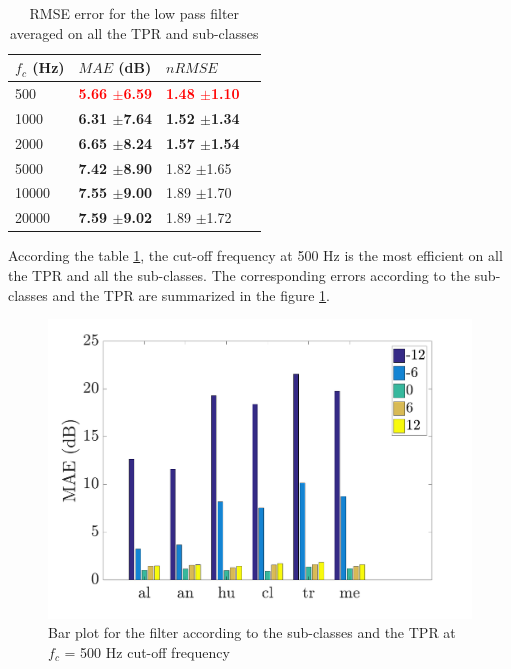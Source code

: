 \documentclass[twocolumn,a4paper,10pt]{article}
\begin{document}
\begin{table}[h]
\centering
\begin{tabular}{llll}
$f_c$ (Hz) & $MAE$ (dB) & $nRMSE$  \\ \hline
 500 & \textbf{\textcolor{red}{5.66 $\pm$6.59}} & \textbf{\textcolor{red}{1.48 $\pm$1.10}} \\
 1000 & \textbf{6.31 $\pm$7.64} & \textbf{1.52 $\pm$1.34} \\
 2000 & \textbf{6.65 $\pm$8.24} & \textbf{1.57 $\pm$1.54} \\
 5000 & \textbf{7.42 $\pm$8.90} & 1.82 $\pm$1.65 \\
10000 & \textbf{7.55 $\pm$9.00} & 1.89 $\pm$1.70 \\
20000 & \textbf{7.59 $\pm$9.02} & 1.89 $\pm$1.72 \\
\end{tabular}
\caption{RMSE error for the low pass filter averaged on all the TPR and sub-classes}
\label{tab:results_filter}
\end{table}

According the table \ref{tab:results_filter}, the cut-off frequency at 500 Hz is the most efficient on all the TPR and all the sub-classes. The corresponding errors according to the sub-classes and the TPR are summarized in the figure \ref{fig:filterAmbiance}.\\

\begin{figure}[hbtp]
\centering
\includegraphics[width=\linewidth]{../image/AmbianceFilter.pdf}
\caption{Bar plot for the filter according to the sub-classes and the TPR at $f_c$ = 500 Hz cut-off frequency}
\label{fig:filterAmbiance}
\end{figure}
\end{document}
